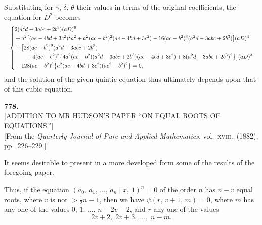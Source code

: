 \documentclass[11pt]{article}
\begin{document}
Substituting for $\gamma,\,\delta,\,\theta$ their values in terms of the original coefficients, the
equation for $D^{2}$ becomes
\[
  \resizebox{\textwidth}{!}{$\displaystyle
  \left\{
  \begin{aligned}
    & 2(a^{2} d - 3 a b c + 2 b^{3})(aD)^{6}\\
    & {} + a^{2}\bigl[(ae - 4 b d + 3 c^{2})^{2} a^{2} + a^{2}(ac - b^{2})^{2}(ae - 4 b d + 3 c^{2}) - 16(ac - b^{2})^{3}(a^{2} d - 3 a b c + 2 b^{3})\bigr] (aD)^{4}\\
    & {} + \bigl[28(ac - b^{2})^{2}(a^{2} d - 3 a b c + 2 b^{3})\\
    & \qquad {} + 4(ae - b^{2})^{2}\bigl\{4 a^{2}(ac - b^{2})(a^{2} d - 3 a b c + 2 b^{3})(ae - 4 b d + 3 c^{2}) + 8(a^{2} d - 3 a b c + 2 b^{3})^{2}\bigr\}\bigr] (aD)^{3}\\
    & {} - 128 (ac - b^{2})^{3} \bigl\{a^{2}(ae - 4 b d + 3 c^{2})(ac^{2} - b^{2})^{2}\bigr\} = 0,
  \end{aligned}
  \right.
  $}
\]
and the solution of the given quintic equation thus ultimately depends upon that of
this cubic equation.


\bigskip

\begin{center}
\textbf{778.}\\[4pt]
\textsc{[ADDITION TO MR HUDSON'S PAPER ``ON EQUAL ROOTS OF EQUATIONS.'']}\\[4pt]
[From the \textit{Quarterly Journal of Pure and Applied Mathematics}, vol.\ \textsc{xviii}.\ (1882), pp.\ 226--229.]
\end{center}

\bigskip

\noindent
It seems desirable to present in a more developed form some of the results of
the foregoing paper.

\medskip
Thus, if the equation $(a_{0},\,a_{1},\,\ldots,\,a_{n} \mid x,\,1)^{n} = 0$
of the order $n$ has $n - v$ equal roots, where $v$ is not $> \tfrac{1}{2}n - 1$, then we have
$\psi(r,\,v+1,\,m) = 0$, where $m$ has any one of the values $0,\,1,\,\ldots,\,n - 2v - 2$,
and $r$ any one of the values
\[
  2v + 2,\; 2v + 3,\; \ldots,\; n - m.
\]
\end{document}
